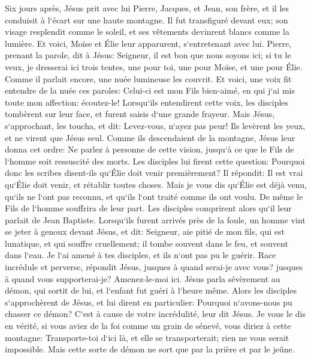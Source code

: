 \verse Six jours après, Jésus prit avec lui Pierre, Jacques, et Jean, son frère, et il les conduisit à l`écart sur une haute montagne. 
\verse Il fut transfiguré devant eux; son visage resplendit comme le soleil, et ses vêtements devinrent blancs comme la lumière. 
\verse Et voici, Moïse et Élie leur apparurent, s`entretenant avec lui. 
\verse Pierre, prenant la parole, dit à Jésus: Seigneur, il est bon que nous soyons ici; si tu le veux, je dresserai ici trois tentes, une pour toi, une pour Moïse, et une pour Élie. 
\verse Comme il parlait encore, une nuée lumineuse les couvrit. Et voici, une voix fit entendre de la nuée ces paroles: Celui-ci est mon Fils bien-aimé, en qui j`ai mis toute mon affection: écoutez-le! 
\verse Lorsqu`ils entendirent cette voix, les disciples tombèrent sur leur face, et furent saisis d`une grande frayeur. 
\verse Mais Jésus, s`approchant, les toucha, et dit: Levez-vous, n`ayez pas peur! 
\verse Ils levèrent les yeux, et ne virent que Jésus seul. 
\verse Comme ils descendaient de la montagne, Jésus leur donna cet ordre: Ne parlez à personne de cette vision, jusqu`à ce que le Fils de l`homme soit ressuscité des morts. 
\verse Les disciples lui firent cette question: Pourquoi donc les scribes disent-ils qu`Élie doit venir premièrement? 
\verse Il répondit: Il est vrai qu`Élie doit venir, et rétablir toutes choses. 
\verse Mais je vous dis qu`Élie est déjà venu, qu`ils ne l`ont pas reconnu, et qu`ils l`ont traité comme ils ont voulu. De même le Fils de l`homme souffrira de leur part. 
\verse Les disciples comprirent alors qu`il leur parlait de Jean Baptiste. 
\verse Lorsqu`ils furent arrivés près de la foule, un homme vint se jeter à genoux devant Jésus, et dit: 
\verse Seigneur, aie pitié de mon fils, qui est lunatique, et qui souffre cruellement; il tombe souvent dans le feu, et souvent dans l`eau. 
\verse Je l`ai amené à tes disciples, et ils n`ont pas pu le guérir. 
\verse Race incrédule et perverse, répondit Jésus, jusques à quand serai-je avec vous? jusques à quand vous supporterai-je? Amenez-le-moi ici. 
\verse Jésus parla sévèrement au démon, qui sortit de lui, et l`enfant fut guéri à l`heure même. 
\verse Alors les disciples s`approchèrent de Jésus, et lui dirent en particulier: Pourquoi n`avons-nous pu chasser ce démon? 
\verse C`est à cause de votre incrédulité, leur dit Jésus. Je vous le dis en vérité, si vous aviez de la foi comme un grain de sénevé, vous diriez à cette montagne: Transporte-toi d`ici là, et elle se transporterait; rien ne vous serait impossible. 
\verse Mais cette sorte de démon ne sort que par la prière et par le jeûne. 
